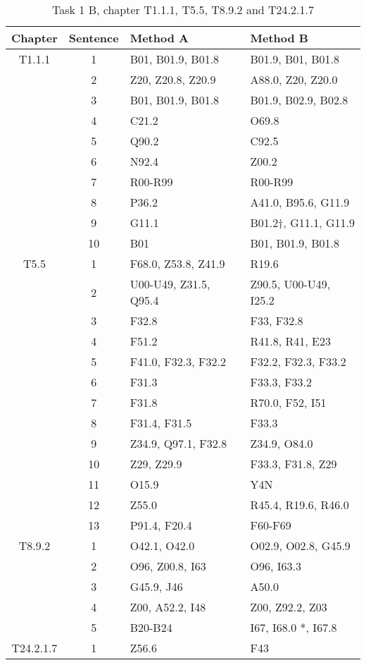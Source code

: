 \begin{table}[htbp] \footnotesize \center
\caption{Task 1 B, chapter T1.1.1, T5.5, T8.9.2 and T24.2.1.7\label{tab:task1b}}
\begin{tabular}{c c l l}
    \toprule
    Chapter & Sentence & Method A & Method B \\
    \midrule
	T1.1.1 & 1 & B01, B01.9, B01.8 & B01.9, B01, B01.8 \\
	 & 2 & Z20, Z20.8, Z20.9 & A88.0, Z20, Z20.0 \\
	 & 3 & B01, B01.9, B01.8 & B01.9, B02.9, B02.8 \\
	 & 4 & C21.2 & O69.8 \\
	 & 5 & Q90.2 & C92.5 \\
	 & 6 & N92.4 & Z00.2 \\
	 & 7 & R00-R99 & R00-R99 \\
	 & 8 & P36.2 & A41.0, B95.6, G11.9 \\
	 & 9 & G11.1 & B01.2†, G11.1, G11.9 \\
	 & 10 & B01 & B01, B01.9, B01.8 \\
	\addlinespace
	T5.5 & 1 & F68.0, Z53.8, Z41.9 & R19.6 \\
	 & 2 & U00-U49, Z31.5, Q95.4 & Z90.5, U00-U49, I25.2 \\
	 & 3 & F32.8 & F33, F32.8 \\
	 & 4 & F51.2 & R41.8, R41, E23 \\
	 & 5 & F41.0, F32.3, F32.2 & F32.2, F32.3, F33.2 \\
	 & 6 & F31.3 & F33.3, F33.2 \\
	 & 7 & F31.8 & R70.0, F52, I51 \\
	 & 8 & F31.4, F31.5 & F33.3 \\
	 & 9 & Z34.9, Q97.1, F32.8 & Z34.9, O84.0 \\
	 & 10 & Z29, Z29.9 & F33.3, F31.8, Z29 \\
	 & 11 & O15.9 & Y4N \\
	 & 12 & Z55.0 & R45.4, R19.6, R46.0 \\
	 & 13 & P91.4, F20.4 & F60-F69 \\
	\addlinespace
	T8.9.2 & 1 & O42.1, O42.0 & O02.9, O02.8, G45.9 \\
	 & 2 & O96, Z00.8, I63 & O96, I63.3 \\
	 & 3 & G45.9, J46 & A50.0 \\
	 & 4 & Z00, A52.2, I48 & Z00, Z92.2, Z03 \\
	 & 5 & B20-B24 & I67, I68.0 *, I67.8 \\
	\addlinespace
	T24.2.1.7 & 1 & Z56.6 & F43 \\

\end{tabular}
\end{table}
